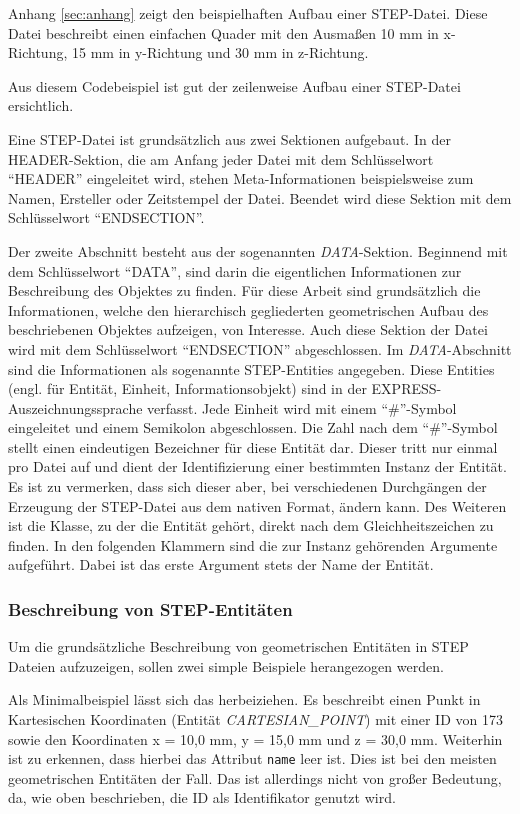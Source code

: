 Anhang \ref{sec:anhang} zeigt den beispielhaften Aufbau einer STEP-Datei. Diese Datei beschreibt einen einfachen Quader mit den Ausmaßen 10 mm in x-Richtung, 15 mm in y-Richtung und 30 mm in z-Richtung. 

Aus diesem Codebeispiel ist gut der zeilenweise Aufbau einer STEP-Datei ersichtlich. 

Eine STEP-Datei ist grundsätzlich aus zwei Sektionen aufgebaut. 
In der HEADER-Sektion, die am Anfang jeder Datei mit dem Schlüsselwort "`HEADER"' eingeleitet wird, stehen Meta-Informationen beispielsweise zum Namen, Ersteller oder Zeitstempel der Datei. Beendet wird diese Sektion mit dem Schlüsselwort "`ENDSECTION"'.

Der zweite Abschnitt besteht aus der sogenannten \textit{DATA}-Sektion. Beginnend mit dem Schlüsselwort "`DATA"', sind darin die eigentlichen Informationen zur Beschreibung des Objektes zu finden. Für diese Arbeit sind grundsätzlich die Informationen, welche den hierarchisch gegliederten geometrischen Aufbau des beschriebenen Objektes aufzeigen, von Interesse. Auch diese Sektion der Datei wird mit dem Schlüsselwort "`ENDSECTION"' abgeschlossen. Im \textit{DATA}-Abschnitt sind die Informationen als sogenannte STEP-Entities angegeben. Diese Entities (engl. für Entität, Einheit, Informationsobjekt) sind in der EXPRESS-Auszeichnungssprache verfasst. Jede Einheit wird mit einem "`\#"'-Symbol eingeleitet und einem Semikolon abgeschlossen. Die Zahl nach dem "`\#"'-Symbol stellt einen eindeutigen Bezeichner für diese Entität dar. Dieser tritt nur einmal pro Datei auf und dient der Identifizierung einer bestimmten Instanz der Entität. Es ist zu vermerken, dass sich dieser aber, bei verschiedenen Durchgängen der Erzeugung der STEP-Datei aus dem nativen Format, ändern kann.
Des Weiteren ist die Klasse, zu der die Entität gehört, direkt nach dem Gleichheitszeichen zu finden. In den folgenden Klammern sind die zur Instanz gehörenden Argumente aufgeführt. Dabei ist das erste Argument stets der Name der Entität. 

\subsubsection{Beschreibung von STEP-Entitäten}

Um die grundsätzliche Beschreibung von geometrischen Entitäten in STEP Dateien aufzuzeigen, sollen zwei simple Beispiele herangezogen werden.

Als Minimalbeispiel lässt sich das  herbeiziehen. Es beschreibt einen Punkt in Kartesischen Koordinaten (Entität \textit{CARTESIAN\_POINT}) mit einer ID von 173 sowie den Koordinaten x = 10,0 mm, y = 15,0 mm und z = 30,0 mm. Weiterhin ist zu erkennen, dass hierbei das Attribut \verb|name| leer ist. Dies ist bei den meisten geometrischen Entitäten der Fall. Das ist allerdings nicht von großer Bedeutung, da, wie oben beschrieben, die ID als Identifikator genutzt wird.    

